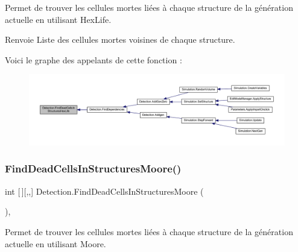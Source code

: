 Permet de trouver les cellules mortes liées à chaque structure de la génération actuelle en utilisant Hex\+Life. 

\begin{DoxyReturn}{Renvoie}
Liste des cellules mortes voisines de chaque structure.
\end{DoxyReturn}
Voici le graphe des appelants de cette fonction \+:
\nopagebreak
\begin{figure}[H]
\begin{center}
\leavevmode
\includegraphics[width=350pt]{class_detection_ac836468018dc40fd2261136a035eb25a_icgraph}
\end{center}
\end{figure}
\mbox{\label{class_detection_a018511f85c3fb9eca82fc06c9f4eb031}} 
\subsubsection{\texorpdfstring{Find\+Dead\+Cells\+In\+Structures\+Moore()}{FindDeadCellsInStructuresMoore()}}
{\footnotesize\ttfamily int \mbox{[}$\,$\mbox{]}\mbox{[},,\mbox{]} Detection.\+Find\+Dead\+Cells\+In\+Structures\+Moore (\begin{DoxyParamCaption}{ }\end{DoxyParamCaption})\hspace{0.3cm}{\ttfamily [inline]}, {\ttfamily [private]}}



Permet de trouver les cellules mortes liées à chaque structure de la génération actuelle en utilisant Moore. 

